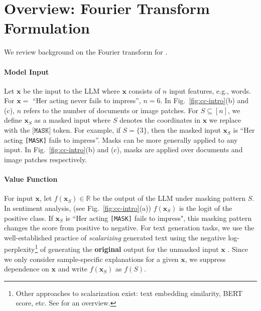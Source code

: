 \section{Overview: Fourier Transform Formulation}
\label{sec:fourier_background}
We review background on the Fourier transform for \SpecExp{}. 

\vspace{-7pt}
\paragraph{Model Input} Let $\mathbf{x}$ be the input to the LLM where $\mathbf{x}$ consists of $n$ input features, e.g., words. 
%
For $\mathbf{x} = $ ``Her acting never fails to impress'', $n = 6$. 
%
In Fig.~\ref{fig:cc-intro}(b) and (c), $n$ refers to the number of documents or image patches. 
%
For $S \subseteq [n]$, we define $\mathbf{x}_{S}$ as a masked input where $S$ denotes the coordinates in $\mathbf{x}$ we replace with the $\texttt{[MASK]}$ token. 
%
For example, if $S = \{3\}$, then the masked input $\mathbf{x}_{S}$ is ``Her acting \texttt{[MASK]} fails to impress''. 
%
Masks can be more generally applied to any input. 
%
In Fig.~\ref{fig:cc-intro}(b) and (c), masks are applied over documents and image patches respectively. 
%

\vspace{-7pt}
\paragraph{Value Function} For input $\mathbf{x}$, let $f(\mathbf{x}_S) \in \mathbb{R}$ be the output of the LLM under masking pattern
$S$. 
%
In sentiment analysis, (see Fig.~\ref{fig:cc-intro}(a)) $f(\mathbf{x}_{S})$ is the logit of the positive class. 
%
If $ \mathbf{x}_{S}$ is ``Her acting \texttt{[MASK]} fails to impress", this masking pattern changes the score from positive to negative.  
%
For text generation tasks, we use the well-established practice of \textit{scalarizing} generated text using the negative log-perplexity\footnote{Other approaches to scalarization exist: text embedding similarity, BERT score, etc. See \cite{paes2024multi} for an overview.} of generating the \textbf{original} output for the unmasked input $\mathbf{x}$ \cite{paes2024multi,cohenwang2024contextciteattributingmodelgeneration}.
%
Since we only consider sample-specific explanations for a given $\mathbf{x}$, we suppress dependence on $\mathbf{x}$ and write $f(\mathbf{x}_S)$ as $f(S)$. 

